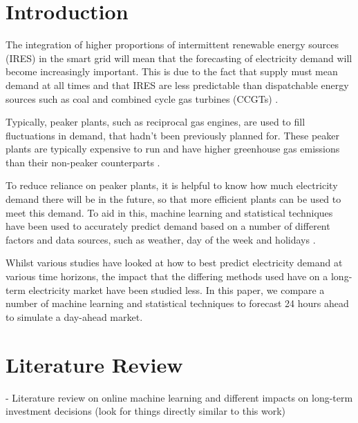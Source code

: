 \documentclass[final,3p,times,twocolumn,numbers]{elsarticle}
\begin{document}

\section{Introduction}
\label{sec:intro}


The integration of higher proportions of intermittent renewable energy sources (IRES) in the smart grid will mean that the forecasting of electricity demand will become increasingly important. This is due to the fact that supply must mean demand at all times and that IRES are less predictable than dispatchable energy sources such as coal and combined cycle gas turbines (CCGTs) \cite{Lu1993}.

Typically, peaker plants, such as reciprocal gas engines, are used to fill fluctuations in demand, that hadn't been previously planned for. These peaker plants are typically expensive to run and have higher greenhouse gas emissions than their non-peaker counterparts \cite{Mahmood2014}. 

To reduce reliance on peaker plants, it is helpful to know how much electricity demand there will be in the future, so that more efficient plants can be used to meet this demand. To aid in this, machine learning and statistical techniques have been used to accurately predict demand based on a number of different factors and data sources, such as weather, day of the week and holidays \cite{Kell2018a, Al-Musaylh2018, Vrablecova2017, Hong2014}. 

Whilst various studies have looked at how to best predict electricity demand at various time horizons, the impact that the differing methods used have on a long-term electricity market have been studied less. In this paper, we compare a number of machine learning and statistical techniques to forecast 24 hours ahead to simulate a day-ahead market. 









\section{Literature Review}
\label{sec:lit-review}

- Literature review on online machine learning and different impacts on long-term investment decisions (look for things directly similar to this work)
\end{document}
